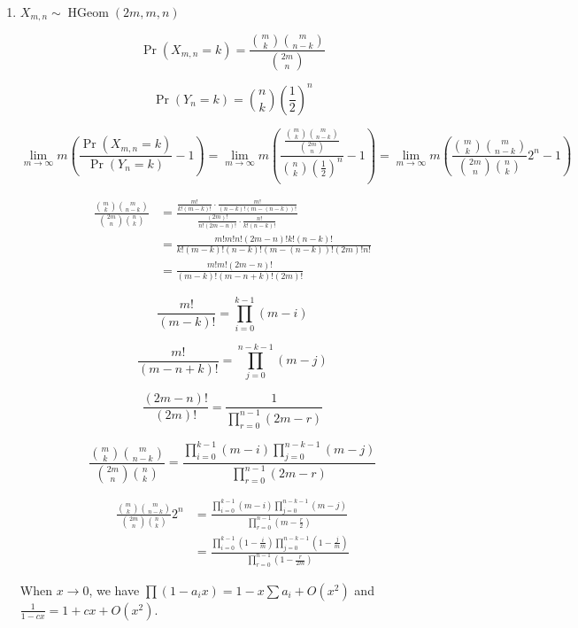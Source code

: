 \documentclass[a4paper]{article}
\begin{document}
\begin{enumerate}
    \item[(a)]
    
    $X_{m,n} \sim \operatorname{HGeom}(2m, m, n)$

    $$
    \Pr(X_{m,n} = k) = \frac{\binom{m}{k} \binom{m}{n-k}}{\binom{2m}{n}}
    $$

    $$
    \Pr(Y_n = k) = \binom{n}{k} \left(\frac{1}{2}\right)^n
    $$

    $$
    \lim_{m \to \infty} m\left(\frac{\Pr(X_{m,n}=k)}{\Pr(Y_n=k)}-1\right)
    = \lim_{m \to \infty} m\left(\frac{\frac{\binom{m}{k} \binom{m}{n-k}}{\binom{2m}{n}}}{\binom{n}{k} \left(\frac{1}{2}\right)^n}-1\right)
    = \lim_{m \to \infty} m\left(\frac{\binom{m}{k} \binom{m}{n-k}}{\binom{2m}{n}\binom{n}{k}} 2^n - 1\right)
    $$

    $$
    \begin{aligned}
    \frac{\binom{m}{k} \binom{m}{n-k}}{\binom{2m}{n}\binom{n}{k}} 
    &= \frac{\frac{m!}{k!(m-k)!} \cdot \frac{m!}{(n-k)!(m-(n-k))!}}{\frac{(2m)!}{n!(2m-n)!} \cdot \frac{n!}{k!(n-k)!}} \\
    &= \frac{m! m! n! (2m-n)! k! (n-k)!}{k!(m-k)!(n-k)!(m-(n-k))!(2m)!n!} \\
    &= \frac{m! m! (2m-n)! }{(m-k)!(m-n+k)!(2m)!}
    \end{aligned}
    $$

    $$
    \frac{m!}{(m-k)!} = \prod_{i=0}^{k-1} (m-i)
    $$

    $$
    \frac{m!}{(m-n+k)!} = \prod_{j=0}^{n-k-1} (m-j)
    $$

    $$
    \frac{(2m-n)!}{(2m)!} = \frac{1}{\prod_{r=0}^{n-1} (2m-r)}
    $$

    $$
    \frac{\binom{m}{k} \binom{m}{n-k}}{\binom{2m}{n}\binom{n}{k}} 
    = \frac{\prod_{i=0}^{k-1} (m-i) \prod_{j=0}^{n-k-1} (m-j)}{\prod_{r=0}^{n-1} (2m-r)}
    $$

    $$
    \begin{aligned}
    \frac{\binom{m}{k} \binom{m}{n-k}}{\binom{2m}{n}\binom{n}{k}} 2^n
    &= \frac{\prod_{i=0}^{k-1} (m-i) \prod_{j=0}^{n-k-1} (m-j)}{\prod_{r=0}^{n-1} (m- \frac{r}{2})} \\
    &= \frac{\prod_{i=0}^{k-1} (1-\frac{i}{m}) \prod_{j=0}^{n-k-1} (1-\frac{j}{m})}{\prod_{r=0}^{n-1} (1- \frac{r}{2m})}
    \end{aligned}
    $$

    When $x \to 0$, we have $\prod (1 - a_i x) = 1 - x \sum a_i + O(x^2)$ and $\frac{1}{1 - cx} = 1 + cx + O(x^2)$.


\end{enumerate}
\end{document}

